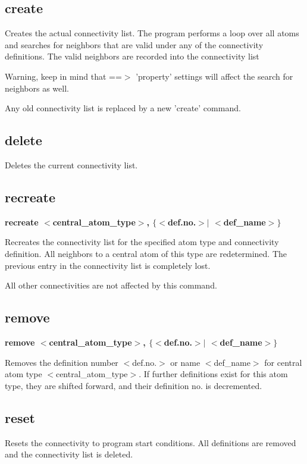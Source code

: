 \subsection*{create}
\par
Creates the actual connectivity list. 
The program performs a loop over all atoms and searches for neighbors 
that are valid under any of the connectivity definitions. The valid 
neighbors are recorded into the connectivity list 
\par
Warning, keep in mind that ==$> $ 'property' settings will affect the 
search for neighbors as well. 
\par
Any old connectivity list is replaced by a new 'create' command. 
\subsection*{delete}
\par
Deletes the current connectivity list. 
\subsection*{recreate}
{\bf recreate $ <$central\_atom\_type$> $, $ \{$$ <$def.no.$> $$| $ $ <$def\_name$> $$\} $ \par }
\par
\vspace{3pt}
Recreates the connectivity list for the specified atom type and 
connectivity definition. 
All neighbors to a central atom of this type are redetermined. 
The previous entry in the connectivity list is completely lost. 
\par
All other connectivities are not affected by this command. 
\subsection*{remove}
{\bf remove $ <$central\_atom\_type$> $, $ \{$$ <$def.no.$> $$| $ $ <$def\_name$> $$\} $ \par }
\par
\vspace{3pt}
Removes the definition number $ <$def.no.$> $ or name $ <$def\_name$> $ for 
central atom type $ <$central\_atom\_type$> $. 
If further definitions exist for this atom type, they are shifted 
forward, and their definition no. is decremented. 
\subsection*{reset}
\par
Resets the connectivity to program start conditions. 
All definitions are removed and the connectivity list is deleted. 
